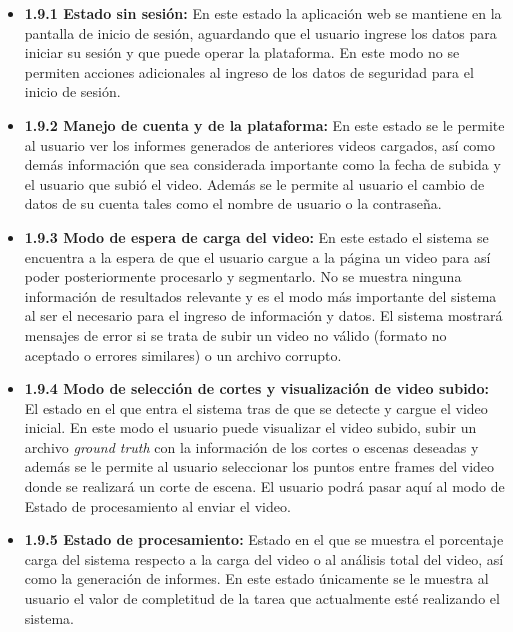 \documentclass[a4paper]{article}
\begin{document}
{\begin{itemize}
\item \textbf{1.9.1 Estado sin sesión:  } En este estado la aplicación web se mantiene en la pantalla de inicio de sesión, aguardando que el usuario ingrese los datos para iniciar su sesión y que puede operar la plataforma. En este modo no  se permiten acciones adicionales al ingreso de los datos de seguridad para el inicio de sesión.\\
\item \textbf{1.9.2 Manejo de cuenta y de la plataforma: } En este estado se le permite al usuario ver los informes generados de anteriores videos cargados, así como demás información que sea considerada importante como la fecha de subida y el usuario que subió el video. Además se le permite al usuario el cambio de datos de su cuenta tales como el nombre de usuario o la contraseña.  \\
\item \textbf{1.9.3 Modo de espera de carga del video: } En este estado el sistema se encuentra a la espera de que el usuario cargue a la página un video para así poder posteriormente procesarlo y segmentarlo. No se muestra ninguna información de resultados relevante y es el modo más importante del sistema al ser el necesario para el ingreso de información y datos. El sistema mostrará mensajes de error si se trata de subir un video no válido (formato no aceptado o errores similares) o un archivo corrupto. \\
\item \textbf{1.9.4 Modo de selección de cortes y visualización de video subido: } El estado en el que entra el sistema tras de que se detecte y cargue el video inicial. En este modo el usuario puede visualizar el video subido, subir un archivo \textit{ground truth} con la información de los cortes o escenas deseadas y además se le permite al usuario seleccionar los puntos entre frames del video donde se realizará un corte de escena. El usuario podrá pasar aquí al modo de Estado de procesamiento al enviar el video.\\ %
\item \textbf{1.9.5 Estado de procesamiento: }Estado en el que se muestra el porcentaje carga del sistema respecto a la carga del video o al análisis total del video, así como la generación de informes. En este estado únicamente se le muestra al usuario el valor de completitud de la tarea que actualmente esté realizando el sistema.  \\

\end{itemize}}
\end{document}
